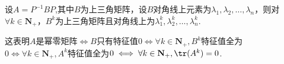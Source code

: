 \begin{exercise}
\begin{exgroup}
\begin{answer}
            设$A=P^{-1}BP$,其中$B$为上三角矩阵，设$B$对角线上元素为$\lambda_1,\lambda_2,\ldots,\lambda_n$，则对$\forall k\in \mathbf{N}_+$，$B^k$为上三角矩阵且对角线上为$\lambda_1^k,\lambda_2^k,\ldots,\lambda_n^k$.

            这表明$A$是幂零矩阵$\iff B$只有特征值$0\iff \forall k\in\mathbf{N}_+,B^k$特征值全为$0\iff \forall k\in\mathbf{N}_+,A^k$特征值全为$0\iff \forall k\in\mathbf{N}_+,\tr(A^k)=0$.
        \end{answer}
    \end{exgroup}
\end{exercise}
